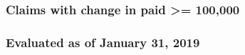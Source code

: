 \documentclass[landscape]{article}
\begin{document}
\hypertarget{claims-with-change-in-paid-100000}{%
\subsubsection{Claims with change in paid \textgreater{}=
100,000}\label{claims-with-change-in-paid-100000}}

\hypertarget{evaluated-as-of-january-31-2019-1}{%
\subsubsection{Evaluated as of January 31,
2019}\label{evaluated-as-of-january-31-2019-1}}

\renewcommand{\arraystretch}{2}

\vspace{1cm}
\end{document}
